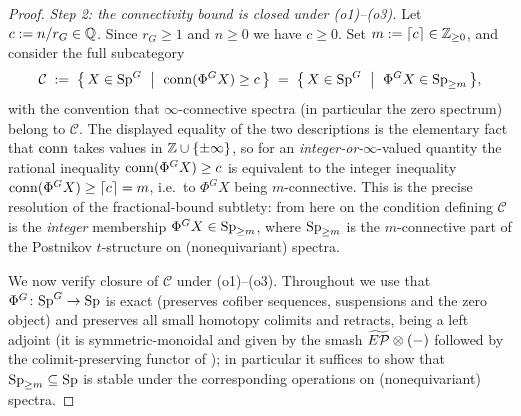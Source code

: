 \begin{proof}
\emph{Step 2: the connectivity bound is closed under (o1)--(o3).}
Let $c:=n/r_G\in\mathbb{Q}$. Since $r_G\ge 1$ and $n\ge0$ we have $c\ge0$. Set
$m:=\lceil c\rceil\in\mathbb{Z}_{\ge0}$, and consider the full subcategory
\[
\mathcal C\;:=\;\bigl\{\,X\in\qfiveSp^G \ \bigm|\ \qfiveconn(\Phi^G X)\ge c\,\bigr\}
\;=\;\bigl\{\,X\in\qfiveSp^G \ \bigm|\ \Phi^G X\in\qfiveSp_{\ge m}\,\bigr\},
\]
with the convention that $\infty$-connective spectra (in particular the zero
spectrum) belong to $\mathcal C$. The displayed equality of the two descriptions
is the elementary fact that $\operatorname{conn}$ takes values in $\mathbb{Z}\cup\{\pm\infty\}$,
so for an \emph{integer-or-$\infty$}-valued quantity the rational inequality
$\operatorname{conn}(\Phi^GX)\ge c$ is equivalent to the integer inequality
$\operatorname{conn}(\Phi^GX)\ge\lceil c\rceil=m$, i.e.\ to $\Phi^GX$ being $m$-connective.
This is the precise resolution of the fractional-bound subtlety: from here on the
condition defining $\mathcal C$ is the \emph{integer} membership
$\Phi^GX\in\mathrm{Sp}_{\ge m}$, where $\mathrm{Sp}_{\ge m}$ is the $m$-connective part of
the Postnikov $t$-structure on (nonequivariant) spectra.

We now verify closure of $\mathcal C$ under (o1)--(o3). Throughout we use that
$\Phi^G\colon\mathrm{Sp}^G\to\mathrm{Sp}$ is exact (preserves cofiber sequences,
suspensions and the zero object) and preserves all small homotopy colimits and
retracts, being a left adjoint (it is symmetric-monoidal and given by the smash
$\widetilde{E\mathcal P}\otimes(-)$ followed by the colimit-preserving functor of \cite[\S2.5.2]{HHR16});
in particular it suffices to show that $\mathrm{Sp}_{\ge m}\subseteq\mathrm{Sp}$ is stable
under the corresponding operations on (nonequivariant) spectra.


\end{proof}
